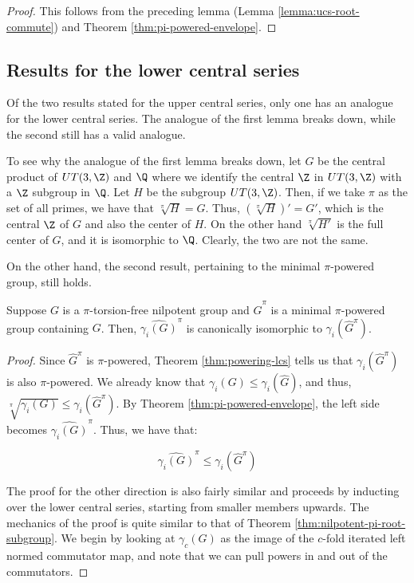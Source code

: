 \documentclass{ucetd}
\begin{document}
\begin{proof}
  This follows from the preceding lemma (Lemma
  \ref{lemma:ucs-root-commute}) and Theorem
  \ref{thm:pi-powered-envelope}.
\end{proof}

\subsection{Results for the lower central series}

Of the two results stated for the upper central series, only one has
an analogue for the lower central series. The analogue of the first lemma
breaks down, while the second still has a valid analogue.

To see why the analogue of the first lemma breaks down, let $G$ be the
central product of $UT(3,\Z)$ and $\Q$ where we identify the central
$\Z$ in $UT(3,\Z)$ with a $\Z$ subgroup in $\Q$. Let $H$ be the
subgroup $UT(3,\Z)$. Then, if we take $\pi$ as the set of all primes,
we have that $\sqrt[\pi]{H} = G$. Thus, $(\sqrt[\pi]{H})' = G'$, which
is the central $\Z$ of $G$ and also the center of $H$. On the other
hand $\sqrt[\pi]{H'}$ is the full center of $G$, and it is isomorphic
to $\Q$. Clearly, the two are not the same.

On the other hand, the second result, pertaining to the minimal
$\pi$-powered group, still holds.

\begin{lemma}\label{lemma:lcs-pi-envelope}
  Suppose $G$ is a $\pi$-torsion-free nilpotent group and $\hat{G}^\pi$ is
  a minimal $\pi$-powered group containing $G$. Then,
  $\hat{\gamma_i(G)}^\pi$ is canonically isomorphic to
  $\gamma_i(\hat{G}^\pi)$.
\end{lemma}

\begin{proof}
  Since $\hat{G}^\pi$ is $\pi$-powered, Theorem \ref{thm:powering-lcs} tells
  us that $\gamma_i(\hat{G}^\pi)$ is also $\pi$-powered. We already
  know that $\gamma_i(G) \le \gamma_i(\hat{G})$, and thus,
  $\sqrt[\pi]{\gamma_i(G)} \le \gamma_i(\hat{G}^{\pi})$. By Theorem
  \ref{thm:pi-powered-envelope}, the left side becomes
  $\hat{\gamma_i(G)}^\pi$. Thus, we have that:

  $$\hat{\gamma_i(G)}^\pi \le \gamma_i(\hat{G}^{\pi})$$

  The proof for the other direction is also fairly similar and
  proceeds by inducting over the lower central series, starting from
  smaller members upwards. The mechanics of the proof is quite similar
  to that of Theorem \ref{thm:nilpotent-pi-root-subgroup}. We begin by
  looking at $\gamma_c(G)$ as the image of the $c$-fold iterated left
  normed commutator map, and note that we can pull powers in and out
  of the commutators. %
\end{proof}
\end{document}
